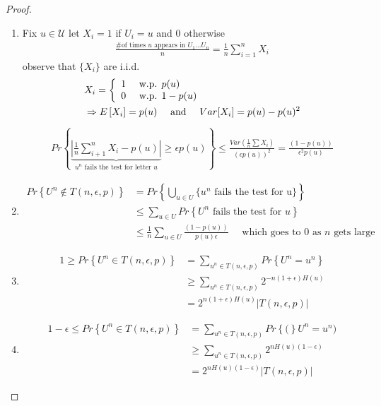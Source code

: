 \documentclass{article}
\theoremstyle{definition} %
\renewcommand{\Pr}[1]{Pr\left\{#1\right\}}
\newcommand{\Ex}[1]{E\left[#1\right]}
\def\U{\mathcal{U}}
\begin{document}
\begin{proof}
  \begin{enumerate}
    \item
    Fix $u \in \U$ let $X_i = 1$ if $ U_i = u$ and $0$ otherwise
    \begin{align*}
      \frac{\text{\# of times } u \text{ appears in } U_1 ... U_n}{n} = \frac{1}{n} \sum_{i = 1}^n X_i
    \end{align*}
    observe that $\{ X_i \}$ are i.i.d.
    \begin{align*}
      &X_i =
      \left\{
        \begin{array}{l l}
          1 & \text{ w.p. } p(u) \\
          0 & \text{ w.p. } 1 - p(u)
        \end{array}
      \right. \\
      &\Rightarrow \Ex{X_i} = p(u) \quad \text{ and } \quad Var[X_i] = p(u) - p(u)^2 \\
    \end{align*}
    \begin{align*}
      \Pr{\underbrace{|\frac{1}{n} \sum_{i+1}^n X_i - p(u)|}_{u^n \text{ fails the test for letter } u} \geq \epsilon p(u)} \leq \frac{Var(\frac{1}{n} \sum X_i)}{(\epsilon p(u))^2}
      = \frac{(1 - p(u))}{\epsilon^2 p(u)}
    \end{align*}

    \item
    \begin{align*}
      \Pr{U^n \not \in T(n, \epsilon, p)} &= \Pr{\bigcup_{u \in U} \{u^n \text{ fails the test for u} \}} \\
      &\leq \sum_{u \in U} \Pr{U^n \text{ fails the test for } u} \\
      &\leq \frac{1}{n} \sum_{u \in U} \frac{(1 - p(u))}{p(u) \epsilon} \quad \text{ which goes to 0 as } n \text{ gets large}
    \end{align*}

    \item
    \begin{align*}
      1 \geq \Pr{U^n \in T(n, \epsilon, p)} &= \sum_{u^n \in T(n, \epsilon, p)} \Pr{U^n = u^n} \\
      &\geq \sum_{u^n \in T(n, \epsilon, p)} 2^{-n(1 + \epsilon) H(u)} \\
      &= 2^{n (1 + \epsilon) H(u)} |T(n, \epsilon, p)|
    \end{align*}

    \item
    \begin{align*}
      1 - \epsilon \leq \Pr{U^n \in T(n, \epsilon, p)} &= \sum_{u^n \in T(n, \epsilon, p)} \Pr(U^n = u^n) \\
       &\geq \sum_{u^n \in T(n, \epsilon, p)} 2^{n H(u)(1-\epsilon)} \\
       &= 2^{n H(u)(1 - \epsilon)} |T(n, \epsilon, p)|
    \end{align*}

  \end{enumerate}
\end{proof}
\end{document}
